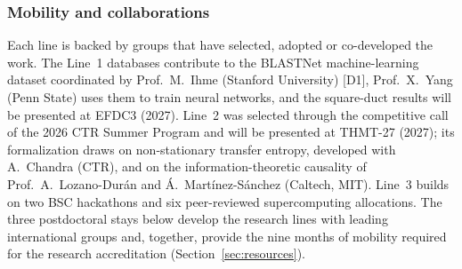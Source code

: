 \documentclass[11pt]{article}
\begin{document}
\subsubsection*{Mobility and collaborations}
Each line is backed by groups that have selected, adopted or co-developed the work. The Line~1
databases contribute to the BLASTNet machine-learning dataset coordinated by Prof.\ M.\ Ihme
(Stanford University) [D1], Prof.\ X.\ Yang (Penn State) uses them to train neural networks, and
the square-duct results will be presented at EFDC3 (2027). Line~2 was selected through the
competitive call of the 2026 CTR Summer Program and will be presented at THMT-27 (2027); its
formalization draws on non-stationary transfer entropy, developed with A.\ Chandra (CTR), and on
the information-theoretic causality of Prof.\ A.\ Lozano-Dur\'an and \'A.\ Mart\'inez-S\'anchez
(Caltech, MIT). Line~3 builds on two BSC hackathons and six peer-reviewed supercomputing
allocations.
The three postdoctoral stays below develop the research lines with leading international
groups and, together, provide the nine months of mobility required for the research
accreditation (Section~\ref{sec:resources}).
\end{document}
